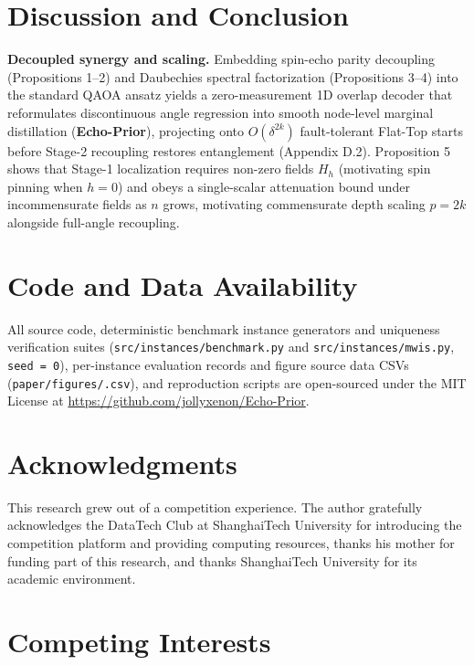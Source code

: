 \documentclass{article}
\theoremstyle{plain}
\theoremstyle{definition}
\begin{document}
\section{Discussion and Conclusion}\label{sec:6}

\textbf{Decoupled synergy and scaling.} Embedding spin-echo parity decoupling (Propositions 1--2) and Daubechies spectral factorization (Propositions 3--4) into the standard QAOA ansatz yields a zero-measurement 1D overlap decoder that reformulates discontinuous angle regression into smooth node-level marginal distillation (\textbf{Echo-Prior}), projecting onto $O(\delta^{2k})$ fault-tolerant Flat-Top starts before Stage-2 recoupling restores entanglement (Appendix D.2). Proposition 5 shows that Stage-1 localization requires non-zero fields $H_h$ (motivating spin pinning when $h=0$) and obeys a single-scalar attenuation bound under incommensurate fields as $n$ grows, motivating commensurate depth scaling $p=2k$ alongside full-angle recoupling.

\clearpage

\section*{Code and Data Availability}

All source code, deterministic benchmark instance generators and uniqueness verification suites (\texttt{src/\allowbreak{}instances/\allowbreak{}benchmark.py} and \texttt{src/\allowbreak{}instances/\allowbreak{}mwis.py}, \texttt{seed = 0}), per-instance evaluation records and figure source data CSVs (\texttt{paper/\allowbreak{}figures/\allowbreak{}{*}.csv}), and reproduction scripts are open-sourced under the MIT License at \url{https://github.com/jollyxenon/Echo-Prior}.

\section*{Acknowledgments}

This research grew out of a competition experience. The author gratefully acknowledges the DataTech Club at ShanghaiTech University for introducing the competition platform and providing computing resources, thanks his mother for funding part of this research, and thanks ShanghaiTech University for its academic environment.

\section*{Competing Interests}
\end{document}
